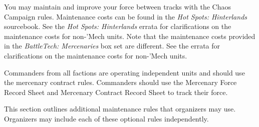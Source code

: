 You may maintain and improve your force between tracks with the Chaos Campaign rules.
Maintenance costs can be found in the \emph{Hot Spots: Hinterlands} sourcebook.
See the \emph{Hot Spots: Hinterlands} errata for clarifications on the maintenance costs for non-'Mech units.
Note that the maintenance costs provided in the \emph{BattleTech: Mercenaries} box set are different.
See the errata for clarifications on the maintenance costs for non-'Mech units.

Commanders from all factions are operating independent units and should use the mercenary contract rules.
Commanders should use the Mercenary Force Record Sheet and Mercenary Contract Record Sheet to track their force.

This section outlines additional maintenance rules that organizers may use.
Organizers may include each of these optional rules independently.
